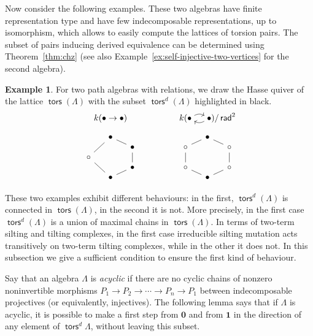 \documentclass[a4paper,11pt]{amsart}
\theoremstyle{plain}
\theoremstyle{definition}
\newtheorem{ex}[thm]{Example}
\DeclareMathOperator{\rad}{\mathsf{rad}}
\DeclareMathOperator{\tors}{\mathsf{tors}}
\begin{document}
Now consider the following examples. These
two algebras have finite representation type and have few indecomposable
representations, up to isomorphism, which allows to easily compute the lattices of torsion
pairs. The subset of pairs inducing derived equivalence can be determined using
Theorem~\ref{thm:chz} (see also Example~\ref{ex:self-injective-two-vertices} for the second algebra).

\begin{ex}
	For two path algebras with relations, we draw the Hasse quiver of the lattice
	$\tors(\Lambda)$ with the subset $\tors^d(\Lambda)$ highlighted in black.
	\[
		\arraycolsep=2pc
		\begin{array}{cc}
			k(\bullet\to\bullet) &
			k(\begin{tikzcd}[sep=small,cramped]\bullet\ar[bend left]{r}&\ar[bend
			left]{l}\bullet\end{tikzcd})/\rad^2 \\[10pt]
		\begin{tikzcd}[row sep=0,column sep=1pc]
			& \bullet \ar[-]{ddl}\ar[-]{dr} \\
			& & \bullet \ar[-]{dd} \\
			\circ \ar[-]{ddr} \\
			& & \bullet \ar[-]{dl} \\
			& \bullet
		\end{tikzcd}
			&
		\begin{tikzcd}[row sep=0,column sep=1pc]
			& \bullet \ar[-]{dl}\ar[-]{dr} \\
			\circ \ar[-]{dd} & & \circ \ar[-]{dd} \\
			\phantom{\bullet}\\
			\circ \ar[-]{dr} & & \circ \ar[-]{dl} \\
			& \bullet
		\end{tikzcd}
		\end{array}
	\]
\end{ex}

These two examples exhibit different behaviours: in the first,
$\tors^d(\Lambda)$ is connected in $\tors(\Lambda)$, in the second it is not.
More precisely, in the first case $\tors^d(\Lambda)$ is a union of maximal
chains in $\tors(\Lambda)$. In terms of two-term silting and tilting complexes,
in the first case irreducible silting mutation acts transitively on two-term tilting
complexes, while in the other it does not. In this subsection we give a
sufficient condition to ensure the first kind of behaviour.

Say that an algebra $\Lambda$ is \emph{acyclic} if there are no cyclic chains of
nonzero noninvertible morphisms $P_1\to P_2\to \cdots \to P_n\to P_1$ between indecomposable
projectives (or equivalently, injectives). The following lemma says that if
$\Lambda$ is acyclic, it is possible to make a first step from $\mathbf{0}$ and from
$\mathbf{1}$ in the direction of any element of $\tors^d\Lambda$, without
leaving this subset.
\end{document}

